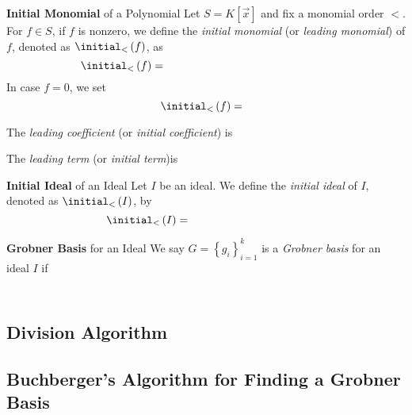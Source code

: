 \documentclass[11pt]{article}
\begin{document}
    \begin{definition}{\textbf{Initial Monomial} of a Polynomial}
        Let $S = K\left[ \vec{x} \right]$ and fix a monomial order $<$. For $f\in S$, if $f$ is nonzero, we define the \emph{initial monomial} (or \emph{leading monomial}) of $f$, denoted as $\initial_<\left( f \right)$, as
        \begin{equation*}
            \initial_< \left( f \right) = \phantom{\text{$<$-greatest monomial of $\supp\left( f \right)$}}
        \end{equation*}
        In case $f=0$, we set
        \begin{equation*}
            \initial_<\left( f \right)=\phantom{0}
        \end{equation*}

        The \emph{leading coefficient} (or \emph{initial coefficient}) is

        The \emph{leading term} (or \emph{initial term})is
    \end{definition}

    \begin{definition}{\textbf{Initial Ideal} of an Ideal}
        Let $I$ be an ideal. We define the \emph{initial ideal} of $I$, denoted as $\initial_<\left( I \right)$, by
        \begin{equation*}
            \initial_<\left( I \right) = \phantom{\left< \initial_<\left( f \right):f\in I \right>}
        \end{equation*}
    \end{definition}

    \begin{definition}{\textbf{Grobner Basis} for an Ideal}
        We say $G=\left\lbrace g_i \right\rbrace^{k}_{i=1}$ is a \emph{Grobner basis} for an ideal $I$ if
        \begin{equation*}
            \phantom{\initial\left( I \right) = \left< \initial\left( g_i \right) \right>^k_{i=1}}
        \end{equation*}
    \end{definition}

    \subsection{Division Algorithm}
    
    \subsection{Buchberger's Algorithm for Finding a Grobner Basis}
\end{document}
